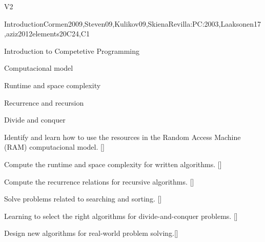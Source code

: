 \begin{syllabus}
  \begin{competences}{V2}
      \item {}
      \item {}
      \item {}
  \end{competences}
  
  \begin{unit}{Introduction}{}{Cormen2009,Steven09,Kulikov09,SkienaRevilla:PC:2003,Laaksonen17,aziz2012elements}{20}{C24,C1}
    \begin{topics}
      \item Introduction to Competetive Programming
      \item Computacional model
      \item Runtime and space complexity
      \item Recurrence and recursion
      \item Divide and conquer
    \end{topics}
    \begin{learningoutcomes}
          \item Identify and learn how to use the resources in the Random Access Machine (RAM) computacional model. [\Usage] 
          \item Compute the runtime and space complexity for written algorithms. [\Usage]
          \item Compute the recurrence relations for recursive algorithms. [\Usage]
          \item Solve problems related to searching and sorting. [\Usage]
          \item Learning to select the right algorithms for divide-and-conquer problems. [\Usage] 
        \item Design new algorithms for real-world problem solving.[\Usage]
    \end{learningoutcomes}
  \end{unit}
  

\end{syllabus}
